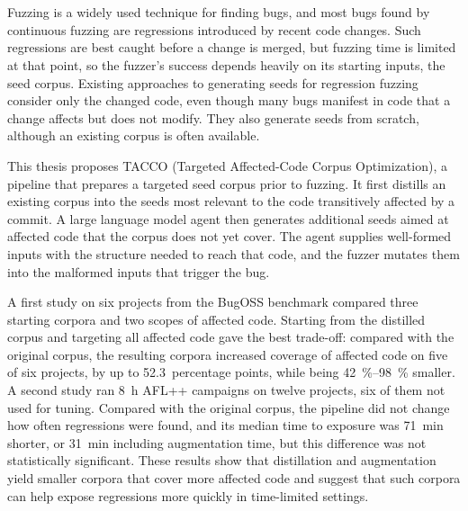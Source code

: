 \chapter{\abstractname}

Fuzzing is a widely used technique for finding bugs, and most bugs found by continuous fuzzing are regressions introduced by recent code changes.
Such regressions are best caught before a change is merged, but fuzzing time is limited at that point, so the fuzzer's success depends heavily on its starting inputs, the seed corpus.
Existing approaches to generating seeds for regression fuzzing consider only the changed code, even though many bugs manifest in code that a change affects but does not modify.
They also generate seeds from scratch, although an existing corpus is often available.

This thesis proposes TACCO (Targeted Affected-Code Corpus Optimization), a pipeline that prepares a targeted seed corpus prior to fuzzing.
It first distills an existing corpus into the seeds most relevant to the code transitively affected by a commit.
A large language model agent then generates additional seeds aimed at affected code that the corpus does not yet cover.
The agent supplies well-formed inputs with the structure needed to reach that code, and the fuzzer mutates them into the malformed inputs that trigger the bug.

A first study on six projects from the BugOSS benchmark compared three starting corpora and two scopes of affected code.
Starting from the distilled corpus and targeting all affected code gave the best trade-off: compared with the original corpus, the resulting corpora increased coverage of affected code on five of six projects, by up to \num{52.3}~percentage points, while being \SIrange{42}{98}{\percent} smaller.
A second study ran \SI{8}{\hour} AFL++ campaigns on twelve projects, six of them not used for tuning.
Compared with the original corpus, the pipeline did not change how often regressions were found, and its median time to exposure was \SI{71}{\minute} shorter, or \SI{31}{\minute} including augmentation time, but this difference was not statistically significant.
These results show that distillation and augmentation yield smaller corpora that cover more affected code and suggest that such corpora can help expose regressions more quickly in time-limited settings.